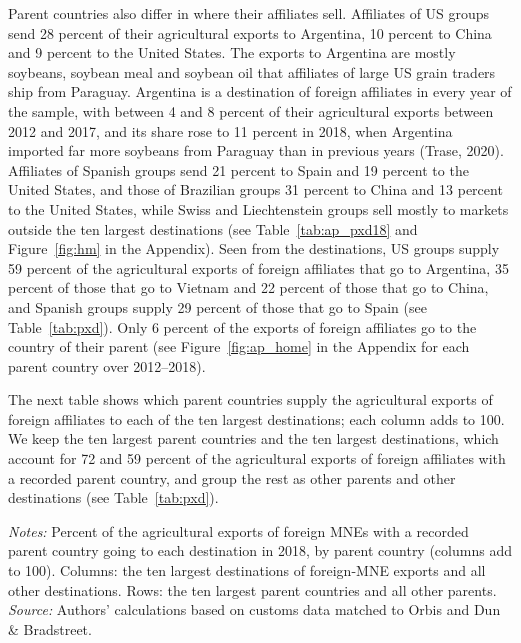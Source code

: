 \documentclass[11pt,a4paper]{article}
\newcommand{\srcnote}{\textit{Source:} Authors' calculations based on customs data matched to Orbis and Dun \& Bradstreet.}
\begin{document}
Parent countries also differ in where their affiliates sell. Affiliates of US groups send 28
percent of their agricultural exports to Argentina, 10 percent to China and 9 percent to the United
States. The exports to Argentina are mostly soybeans, soybean meal and soybean oil that affiliates of
large US grain traders ship from Paraguay. Argentina is a destination of foreign affiliates in every
year of the sample, with between 4 and 8 percent of their agricultural exports between 2012 and
2017, and its share rose to 11 percent in 2018, when Argentina imported far more soybeans from
Paraguay than in previous years (Trase, 2020). Affiliates of Spanish groups send 21 percent to Spain and 19 percent to the United States,
and those of Brazilian groups 31 percent to China and 13 percent to the United States, while Swiss
and Liechtenstein groups sell mostly to markets outside the ten largest destinations (see
Table~\ref{tab:ap_pxd18} and Figure~\ref{fig:hm} in the Appendix). Seen from the destinations, US
groups supply 59 percent of the agricultural exports of foreign affiliates
that go to Argentina, 35 percent of those that go to Vietnam and 22 percent of those that go to
China, and Spanish groups supply 29 percent of those that go to Spain (see Table~\ref{tab:pxd}). Only 6 percent of
the exports of foreign affiliates go to the country of their parent (see
Figure~\ref{fig:ap_home} in the Appendix for each parent country over 2012--2018).

The next table shows which parent countries supply the agricultural exports of foreign affiliates
to each of the ten largest destinations; each column adds to 100. We keep the ten largest parent
countries and the ten largest destinations, which account for 72 and 59 percent of the
agricultural exports of foreign affiliates with a recorded parent country, and group the rest as
other parents and other destinations (see Table~\ref{tab:pxd}).
\begin{table}[H]\centering\footnotesize%
  \caption{Foreign-Multinational Agricultural Exports: Top 10 Destinations and Top 10 Parents, 2018}%
  \label{tab:pxd}%
  \par\vspace{3pt}%
  \begin{minipage}{0.95\textwidth}\footnotesize %
  \textit{Notes:} Percent of the agricultural exports of foreign MNEs with a recorded parent country going to each destination in 2018, by parent country (columns add to 100). Columns: the ten largest destinations of foreign-MNE exports and all other destinations. Rows: the ten largest parent countries and all other parents.\\[3pt]%
  \srcnote%
  \end{minipage}%
  \end{table}
\end{document}

